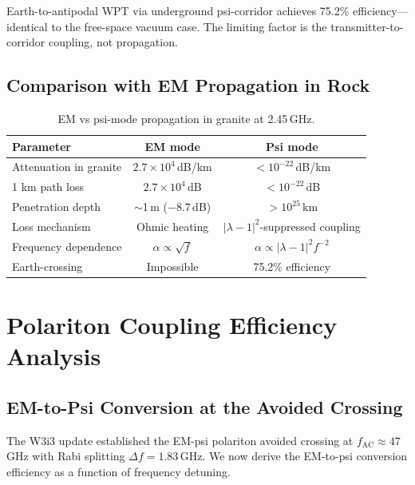 \documentclass[aps,prd,twocolumn,superscriptaddress]{revtex4-2}
\newcommand{\lambdaone}{|\lambda{-}1|}
\begin{document}
Earth-to-antipodal WPT via underground psi-corridor achieves
75.2\% efficiency---identical to the free-space vacuum case.
The limiting factor is the transmitter-to-corridor coupling,
not propagation.

\subsection{Comparison with EM Propagation in Rock}

\begin{table}[H]
\centering
\caption{EM vs psi-mode propagation in granite at 2.45\,GHz.}
\label{tab:EM_vs_psi}
\begin{tabular}{lcc}
\toprule
Parameter & EM mode & Psi mode \\
\midrule
Attenuation in granite & $2.7\times10^4$\,dB/km & $<10^{-22}$\,dB/km \\
1 km path loss & $2.7\times10^4$\,dB & $<10^{-22}$\,dB \\
Penetration depth & $\sim$1\,m ($-8.7$\,dB) & $>10^{25}$\,km \\
Loss mechanism & Ohmic heating & $\lambdaone^2$-suppressed coupling \\
Frequency dependence & $\alpha\propto\sqrt{f}$ & $\alpha\propto\lambdaone^2 f^{-2}$ \\
Earth-crossing & Impossible & 75.2\% efficiency \\
\bottomrule
\end{tabular}
\end{table}

\section{Polariton Coupling Efficiency Analysis}
\label{sec:polariton}

\subsection{EM-to-Psi Conversion at the Avoided Crossing}

The W3i3 update established the EM-psi polariton avoided crossing
at $f_\mathrm{AC} \approx 47$\,GHz with Rabi splitting
$\Delta f = 1.83$\,GHz.  We now derive the EM-to-psi conversion
efficiency as a function of frequency detuning.
\end{document}
